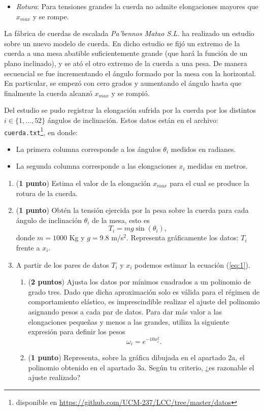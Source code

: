 \begin{paracol}{2}
\begin{itemize}
\item \emph{Rotura}: Para tensiones grandes la cuerda no admite elongaciones mayores que $x_{max}$ y se rompe.

\end{itemize}

La fábrica de cuerdas de escalada \textit{Pa'bennos Matao S.L.} ha realizado un estudio sobre un nuevo modelo de cuerda. En dicho estudio se fijó un extremo de la cuerda a una mesa abatible suficientemente grande (que hará la función de un plano inclinado), y se ató el otro extremo de la cuerda a una pesa. De manera secuencial se fue incrementando el ángulo formado por la mesa con la horizontal. En particular, se empezó con cero grados y aumentando el ángulo hasta que finalmente la cuerda alcanzó $x_{max}$ y se rompió. 

Del estudio se pudo registrar la elongación sufrida por la cuerda por los distintos $i\in\{1,\dots,52\}$ ángulos de inclinación. Estos datos están en el archivo:  \texttt{cuerda.txt}\footnote{disponible en \url{https://github.com/UCM-237/LCC/tree/master/datos}}, en donde:
\begin{itemize}
	\item La primera columna corresponde a los ángulos $\theta_i$ medidos en radianes.
	\item La segunda columna corresponde a las elongaciones $x_i$ medidas en metros.
\end{itemize}

\begin{enumerate}
\item (\textbf{1 punto}) Estima el valor de la elongación $x_{max}$ para el cual se produce la rotura de la cuerda.

\item (\textbf{1 punto}) Obtén la tensión ejercida por la pesa sobre la cuerda para cada ángulo de inclinación $\theta_i$ de la mesa, esto es
\begin{equation} \label{eq:2}
T_i = mg\sin(\theta_i),
\end{equation}
donde $m =1000$ Kg y $g = 9.8$ m/s$^2$. Representa gráficamente los datos: $T_i$ frente a $x_i$.

\item A partir de los pares de datos $T_i$ y $x_i$ podemos estimar la ecuación (\ref{eq:1}).
\begin{enumerate}
\item (\textbf{2 puntos}) Ajusta los datos por mínimos cuadrados a un polinomio de grado tres. Dado que dicha aproximación solo es válida para el régimen de comportamiento elástico, es imprescindible realizar el ajuste del polinomio asignando pesos a cada par de datos. Para dar más valor a las elongaciones pequeñas y menos a las grandes, utiliza la siguiente expresión para definir los pesos
\begin{equation}
\omega_i = e^{-10x_i^2}.
\end{equation}
\item (\textbf{1 punto})  Representa, sobre la gráfica dibujada en el apartado 2a, el polinomio obtenido en el apartado 3a. Según tu criterio, ¿es razonable el ajuste realizado?
\end{enumerate}


\end{enumerate}
\end{paracol}
